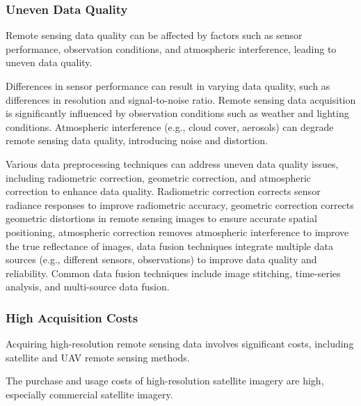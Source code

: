 \subsubsection{Uneven Data Quality}

Remote sensing data quality can be affected by factors such as sensor performance, observation conditions, and atmospheric interference, leading to uneven data quality.

Differences in sensor performance can result in varying data quality, such as differences in resolution and signal-to-noise ratio.
Remote sensing data acquisition is significantly influenced by observation conditions such as weather and lighting conditions.
Atmospheric interference (e.g., cloud cover, aerosols) can degrade remote sensing data quality, introducing noise and distortion.

Various data preprocessing techniques can address uneven data quality issues, including radiometric correction, geometric correction, and atmospheric correction to enhance data quality\cite{sahooHyperspectralRemoteSensing2015}. Radiometric correction corrects sensor radiance responses to improve radiometric accuracy, geometric correction corrects geometric distortions in remote sensing images to ensure accurate spatial positioning, atmospheric correction removes atmospheric interference to improve the true reflectance of images, data fusion techniques integrate multiple data sources (e.g., different sensors, observations) to improve data quality and reliability. Common data fusion techniques include image stitching, time-series analysis, and multi-source data fusion.

\subsubsection{High Acquisition Costs}

Acquiring high-resolution remote sensing data involves significant costs, including satellite and UAV remote sensing methods.

The purchase and usage costs of high-resolution satellite imagery are high, especially commercial satellite imagery.

